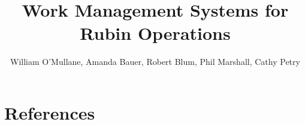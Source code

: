 \documentclass[DM,authoryear,toc]{lsstdoc}
\title{Work Management Systems for Rubin Operations}
\author{%
William O'Mullane, Amanda Bauer, Robert Blum, Phil Marshall, Cathy Petry
}
\date{\vcsDate}
\begin{document}
\maketitle



\appendix
\section{References} \label{sec:bib}
\renewcommand{\refname}{} %


%
\printglossaries
\end{document}
